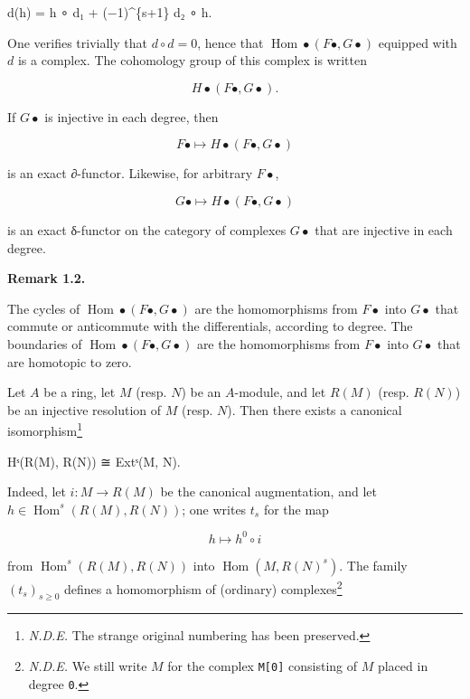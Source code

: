 \documentclass[
]{article}
\newenvironment{Shaded}{}{}
\newcommand{\NormalTok}[1]{#1}
\begin{document}
\begin{Shaded}
\begin{Highlighting}[]
\NormalTok{d(h) = h ∘ d₁ + (−1)\^{}\{s+1\} d₂ ∘ h.}
\end{Highlighting}
\end{Shaded}

One verifies trivially that \(d \circ d = 0\), hence that
\(\operatorname{Hom}\bullet(F\bullet, G\bullet)\) equipped with \(d\) is
a complex. The cohomology group of this complex is written

\[
H\bullet(F\bullet, G\bullet).
\]

If \(G\bullet\) is injective in each degree, then

\[
F\bullet \mapsto H\bullet(F\bullet, G\bullet)
\]

is an exact ∂-functor. Likewise, for arbitrary \(F\bullet\),

\[
G\bullet \mapsto H\bullet(F\bullet, G\bullet)
\]

is an exact δ-functor on the category of complexes \(G\bullet\) that are
injective in each degree.

\textbf{Remark 1.2.}

The cycles of \(\operatorname{Hom}\bullet(F\bullet, G\bullet)\) are the
homomorphisms from \(F\bullet\) into \(G\bullet\) that commute or
anticommute with the differentials, according to degree. The boundaries
of \(\operatorname{Hom}\bullet(F\bullet, G\bullet)\) are the
homomorphisms from \(F\bullet\) into \(G\bullet\) that are homotopic to
zero.

Let \(A\) be a ring, let \(M\) (resp. \(N\)) be an \(A\)-module, and let
\(R(M)\) (resp. \(R(N)\)) be an injective resolution of \(M\) (resp.
\(N\)). Then there exists a canonical isomorphism\footnote{\emph{N.D.E.}
  The strange original numbering has been preserved.}

\begin{Shaded}
\begin{Highlighting}[]
\NormalTok{Hˢ(R(M), R(N)) ≅ Extˢ(M, N).}
\end{Highlighting}
\end{Shaded}

Indeed, let \(i: M \to R(M)\) be the canonical augmentation, and let
\(h \in \operatorname{Hom}^{s}(R(M), R(N))\); one writes \(t_{s}\) for
the map

\[
h \mapsto h^{0} \circ i
\]

from \(\operatorname{Hom}^{s}(R(M), R(N))\) into
\(\operatorname{Hom}(M, R(N)^{s})\). The family
\((t_{s})_{s\geqslant 0}\) defines a homomorphism of (ordinary)
complexes\footnote{\emph{N.D.E.} We still write \(M\) for the complex
  \texttt{M{[}0{]}} consisting of \(M\) placed in degree \texttt{0}.}
\end{document}
